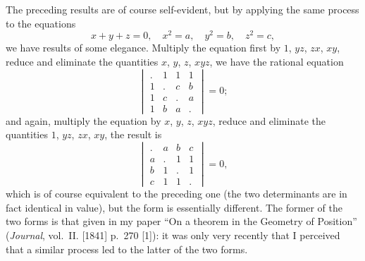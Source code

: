\documentclass[11pt]{article}
\begin{document}
The preceding results are of course self-evident, but by applying the same process to the equations
\[
x + y + z = 0, \quad x^2 = a, \quad y^2 = b, \quad z^2 = c,
\]
we have results of some elegance. Multiply the equation first by $1$, $yz$, $zx$, $xy$, reduce and eliminate the quantities $x$, $y$, $z$, $xyz$, we have the rational equation
\[
\begin{vmatrix}
. & 1 & 1 & 1 \\
1 & . & c & b \\
1 & c & . & a \\
1 & b & a & .
\end{vmatrix} = 0;
\]
and again, multiply the equation by $x$, $y$, $z$, $xyz$, reduce and eliminate the quantities $1$, $yz$, $zx$, $xy$, the result is
\[
\begin{vmatrix}
. & a & b & c \\
a & . & 1 & 1 \\
b & 1 & . & 1 \\
c & 1 & 1 & .
\end{vmatrix} = 0,
\]
which is of course equivalent to the preceding one (the two determinants are in fact identical in value), but the form is essentially different. The former of the two forms is that given in my paper ``On a theorem in the Geometry of Position'' (\textit{Journal}, vol.~II. [1841] p.~270 [1]): it was only very recently that I perceived that a similar process led to the latter of the two forms.
\end{document}
